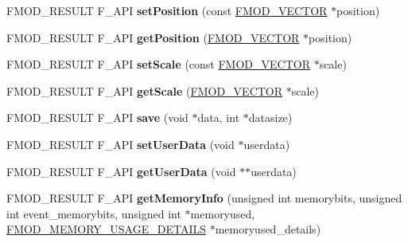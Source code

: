\begin{DoxyCompactItemize}
\item 
\hypertarget{class_f_m_o_d_1_1_geometry_a36ca90c62cbc0c37938a51750ce865e7}{F\-M\-O\-D\-\_\-\-R\-E\-S\-U\-L\-T F\-\_\-\-A\-P\-I {\bfseries set\-Position} (const \hyperlink{struct_f_m_o_d___v_e_c_t_o_r}{F\-M\-O\-D\-\_\-\-V\-E\-C\-T\-O\-R} $\ast$position)}\label{class_f_m_o_d_1_1_geometry_a36ca90c62cbc0c37938a51750ce865e7}

\item 
\hypertarget{class_f_m_o_d_1_1_geometry_a2d0e4a6525b54cd9a39c447995eba296}{F\-M\-O\-D\-\_\-\-R\-E\-S\-U\-L\-T F\-\_\-\-A\-P\-I {\bfseries get\-Position} (\hyperlink{struct_f_m_o_d___v_e_c_t_o_r}{F\-M\-O\-D\-\_\-\-V\-E\-C\-T\-O\-R} $\ast$position)}\label{class_f_m_o_d_1_1_geometry_a2d0e4a6525b54cd9a39c447995eba296}

\item 
\hypertarget{class_f_m_o_d_1_1_geometry_a46104dceeff4a02e5aae989f86951b2f}{F\-M\-O\-D\-\_\-\-R\-E\-S\-U\-L\-T F\-\_\-\-A\-P\-I {\bfseries set\-Scale} (const \hyperlink{struct_f_m_o_d___v_e_c_t_o_r}{F\-M\-O\-D\-\_\-\-V\-E\-C\-T\-O\-R} $\ast$scale)}\label{class_f_m_o_d_1_1_geometry_a46104dceeff4a02e5aae989f86951b2f}

\item 
\hypertarget{class_f_m_o_d_1_1_geometry_a40f45f30258de49daf8bee7063afa9e9}{F\-M\-O\-D\-\_\-\-R\-E\-S\-U\-L\-T F\-\_\-\-A\-P\-I {\bfseries get\-Scale} (\hyperlink{struct_f_m_o_d___v_e_c_t_o_r}{F\-M\-O\-D\-\_\-\-V\-E\-C\-T\-O\-R} $\ast$scale)}\label{class_f_m_o_d_1_1_geometry_a40f45f30258de49daf8bee7063afa9e9}

\item 
\hypertarget{class_f_m_o_d_1_1_geometry_a066a05c012e2d41f1ca929ab0328aa25}{F\-M\-O\-D\-\_\-\-R\-E\-S\-U\-L\-T F\-\_\-\-A\-P\-I {\bfseries save} (void $\ast$data, int $\ast$datasize)}\label{class_f_m_o_d_1_1_geometry_a066a05c012e2d41f1ca929ab0328aa25}

\item 
\hypertarget{class_f_m_o_d_1_1_geometry_a9e7359878a030cf144cfdd773dfce85a}{F\-M\-O\-D\-\_\-\-R\-E\-S\-U\-L\-T F\-\_\-\-A\-P\-I {\bfseries set\-User\-Data} (void $\ast$userdata)}\label{class_f_m_o_d_1_1_geometry_a9e7359878a030cf144cfdd773dfce85a}

\item 
\hypertarget{class_f_m_o_d_1_1_geometry_ab8502126a540d836f0fee179f2310c8f}{F\-M\-O\-D\-\_\-\-R\-E\-S\-U\-L\-T F\-\_\-\-A\-P\-I {\bfseries get\-User\-Data} (void $\ast$$\ast$userdata)}\label{class_f_m_o_d_1_1_geometry_ab8502126a540d836f0fee179f2310c8f}

\item 
\hypertarget{class_f_m_o_d_1_1_geometry_a3dd06bc4077fac782ed5487c347ff14d}{F\-M\-O\-D\-\_\-\-R\-E\-S\-U\-L\-T F\-\_\-\-A\-P\-I {\bfseries get\-Memory\-Info} (unsigned int memorybits, unsigned int event\-\_\-memorybits, unsigned int $\ast$memoryused, \hyperlink{struct_f_m_o_d___m_e_m_o_r_y___u_s_a_g_e___d_e_t_a_i_l_s}{F\-M\-O\-D\-\_\-\-M\-E\-M\-O\-R\-Y\-\_\-\-U\-S\-A\-G\-E\-\_\-\-D\-E\-T\-A\-I\-L\-S} $\ast$memoryused\-\_\-details)}\label{class_f_m_o_d_1_1_geometry_a3dd06bc4077fac782ed5487c347ff14d}

\end{DoxyCompactItemize}


